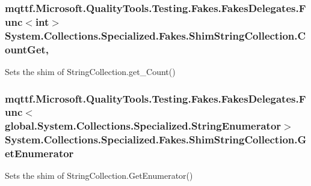 \hypertarget{class_system_1_1_collections_1_1_specialized_1_1_fakes_1_1_shim_string_collection_a20b5773339ecd1248979030ccf3fc54f}{
\subsubsection[{Count\-Get}]{\setlength{\rightskip}{0pt plus 5cm}mqttf.\-Microsoft.\-Quality\-Tools.\-Testing.\-Fakes.\-Fakes\-Delegates.\-Func$<$int$>$ System.\-Collections.\-Specialized.\-Fakes.\-Shim\-String\-Collection.\-Count\-Get\hspace{0.3cm}{\ttfamily [get]}, {\ttfamily [set]}}}\label{class_system_1_1_collections_1_1_specialized_1_1_fakes_1_1_shim_string_collection_a20b5773339ecd1248979030ccf3fc54f}


Sets the shim of String\-Collection.\-get\-\_\-\-Count()

\hypertarget{class_system_1_1_collections_1_1_specialized_1_1_fakes_1_1_shim_string_collection_abfe9c74d93bb2cf8868e3ced29fc5d9b}{
\subsubsection[{Get\-Enumerator}]{\setlength{\rightskip}{0pt plus 5cm}mqttf.\-Microsoft.\-Quality\-Tools.\-Testing.\-Fakes.\-Fakes\-Delegates.\-Func$<$global.\-System.\-Collections.\-Specialized.\-String\-Enumerator$>$ System.\-Collections.\-Specialized.\-Fakes.\-Shim\-String\-Collection.\-Get\-Enumerator\hspace{0.3cm}{\ttfamily [set]}}}\label{class_system_1_1_collections_1_1_specialized_1_1_fakes_1_1_shim_string_collection_abfe9c74d93bb2cf8868e3ced29fc5d9b}


Sets the shim of String\-Collection.\-Get\-Enumerator()


